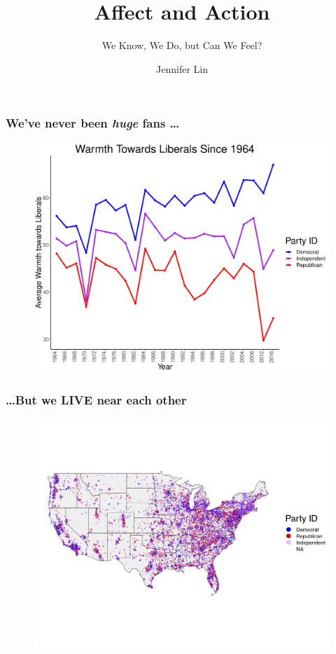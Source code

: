 \documentclass[14pt]{beamer}
\newcommand\e{\emph}
\begin{document}
	\author{Jennifer Lin}
	\title{Affect and Action}
	\subtitle{We Know, We Do, but Can We Feel?}
	\begin{frame}[plain]
	\maketitle
\end{frame}



\begin{frame}
\frametitle{We've never been \e{huge} fans \ldots}
\begin{center}
	\begin{figure}[ht!]  
		{	 \includegraphics[width=.8\textwidth]{Liberals}}
	\end{figure}
\end{center}
\end{frame}

\begin{frame}
\frametitle{\ldots But we LIVE near each other}
\begin{center}
	\begin{figure}[ht!]  
		{	 \includegraphics[width=\textwidth]{USMap}}
	\end{figure}
\end{center}
\end{frame}
\end{document}
